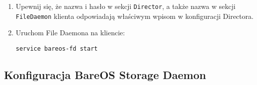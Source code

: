 \documentclass[polish]{article}
\begin{document}
\begin{enumerate}

\item Upewnij się, że nazwa i hasło w sekcji \texttt{Director}, a także nazwa w sekcji \texttt{FileDaemon} klienta odpowiadają właściwym wpisom w konfiguracji Directora.

\item Uruchom File Daemona na kliencie:
\begin{verbatim}
service bareos-fd start
\end{verbatim}

\end{enumerate}


\subsection*{Konfiguracja BareOS Storage Daemon}
\end{document}
